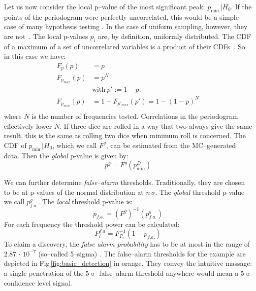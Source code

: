 
Let us now consider the local p--value of the most significant peak: $p_{\mathrm{min}} \, | H_0$. If the points of the periodogram were perfectly uncorrelated, this would be a simple case of many hypothesis testing \cite{Algeri2016}. In the case of uniform sampling, however, they are not~\cite{Scargle1982}. The local p-values $p_i$ are, by definition, uniformly distributed. The CDF of a maximum of a set of uncorrelated variables is a product of their CDFs~\cite{Papoulis2002}. So in this case we have:
\begin{align}
  F_p(p) &= p \\
  F_{p_{max}}(p) &= p^N \\
  &\text{with}\ p' := 1 - p :\\
  F_{p_{min}}(p) &= 1 - F_{p'_{max}}(p') = 1 - (1 - p)^N \label{eq:Fpmin}\\
\end{align}
where $N$ is the number of frequencies tested. Correlations in the periodogram effectively lower $N$.  If three dice are rolled in a way that two always give the same result, this is the same as rolling two dice when minimum roll is concerned. The CDF of $p_{\mathrm{min}} \, | H_0$, which we call $F^g$, can be estimated from the MC--generated data. Then the \emph{global} p-value is given by:
\begin{equation}
  p^g = F^g(p_{\mathrm{min}}^D)
\end{equation}

We can further determine \emph{false--alarm} thresholds. Traditionally, they are chosen to be at p-values of the normal distribution at $n \,\sigma$. The \emph{global} threshold p-value we call $p^g_{f.a.}$. The \emph{local} threshold p-value is:
\begin{equation}
  p_{f.a.} = \left( F^g \right)^{-1}(p^g_{f.a.})
\end{equation}
For each frequency the threshold power can be calculated:
\begin{equation}
  P^{f.a}_i = F_{P_i}^{-1}(1 - p_{f.a.})
\end{equation}
To claim a discovery, the \emph{false alarm probability} has to be at most in the range of $2.87\,\cdot\,10^{-7}$ (so--called 5--sigma) \cite{PDG2016}. The false--alarm thresholds for the example are depicted in Fig\,\ref{fig:basic_detection} in orange. They convey the intuitive massage: a single penetration of the 5$\upsigma$ false--alarm threshold anywhere would mean a 5$\upsigma$ confidence level signal.


